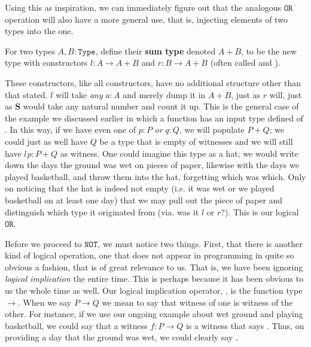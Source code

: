 \documentclass[11pt]{article}
\begin{document}
Using this as inspiration, we can immediately figure out that the analogous $\mathtt{OR}$ operation will also have a more general use, that is, injecting elements of two types into the one.

\begin{definition}
For two types $A, B \colon \mathtt{Type}$, define their \textbf{sum type} denoted $A + B$, to be the new type with constructors $l\colon A \to A + B$ and $r \colon B \to A + B$ (often called  and ).
\end{definition}

These constructors, like all constructors, have no additional structure other than that stated. $l$ will take \emph{any} $a \colon A$ and merely dump it in $A + B$, just as $r$ will, just as $\mathbf{S}$ would take any natural number and count it up. This is the general case of the example we discussed earlier in which a function has an input type defined of . In this way, if we have even one of $p \colon P$ \emph{or} $q \colon Q$, we will populate $P + Q$; we could just as well have $Q$ be a type that is empty of witnesses and we will still have $l \hspace{1pt} p \colon P + Q$ as witness. One could imagine this type as a hat; we would write down the days the ground was wet on pieces of paper, likewise with the days we played basketball, and throw them into the hat, forgetting which was which. Only on noticing that the hat is indeed not empty (i.e. it was wet or we played basketball on at least one day) that we may pull out the piece of paper and distinguish which type it originated from (via. was it $l$ or $r$?). This is our logical $\mathtt{OR}$.

Before we proceed to $\mathtt{NOT}$, we must notice two things. First, that there is another kind of logical operation, one that does not appear in programming in quite so obvious a fashion, that is of great relevance to us. That is, we have been ignoring \emph{logical implication} the entire time. This is perhaps because it has been obvious to us the whole time as well. Our logical implication operator, , is the function type $\to$. When we say $P \to Q$ we mean to say that witness of one is witness of the other. For instance, if we use our ongoing example about wet ground and playing basketball, we could say that a witness $f \colon P \to Q$ is a witness that says . Thus, on providing a day that the ground was wet, we could clearly say .
\end{document}
